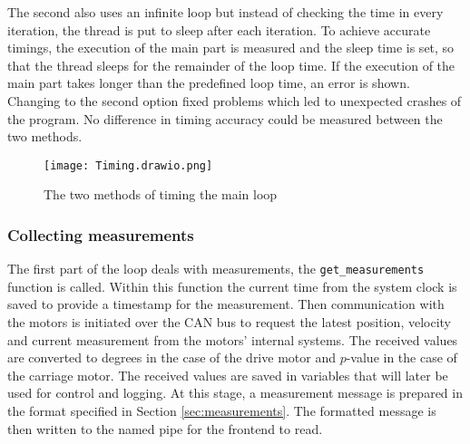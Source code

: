 \documentclass[12pt]{article}
\begin{document}
The second also uses an infinite loop but instead of checking the time in every iteration, the thread is put to sleep after each iteration. To achieve accurate timings, the execution of the main part is measured and the sleep time is set, so that the thread sleeps for the remainder of the loop time. If the execution of the main part takes longer than the predefined loop time, an error is shown.
Changing to the second option fixed problems which led to unexpected crashes of the program. No difference in timing accuracy could be measured between the two methods.

\begin{figure}[h]
    \centering
    \texttt{[image: Timing.drawio.png]}
    \caption{The two methods of timing the main loop}
    \label{fig:timings}
\end{figure}



\subsubsection{Collecting measurements}
The first part of the loop deals with measurements, the \verb|get_measurements| function is called. Within this function the current time from the system clock is saved to provide a timestamp for the measurement. Then communication with the motors is initiated over the CAN bus to request the latest position, velocity and current measurement from the motors' internal systems. The received values are converted to degrees in the case of the drive motor and $p$-value in the case of the carriage motor. The received values are saved in variables that will later be used for control and logging. At this stage, a measurement message is prepared in the format specified in Section \ref{sec:measurements}. The formatted message is then written to the named pipe for the frontend to read.
\end{document}
